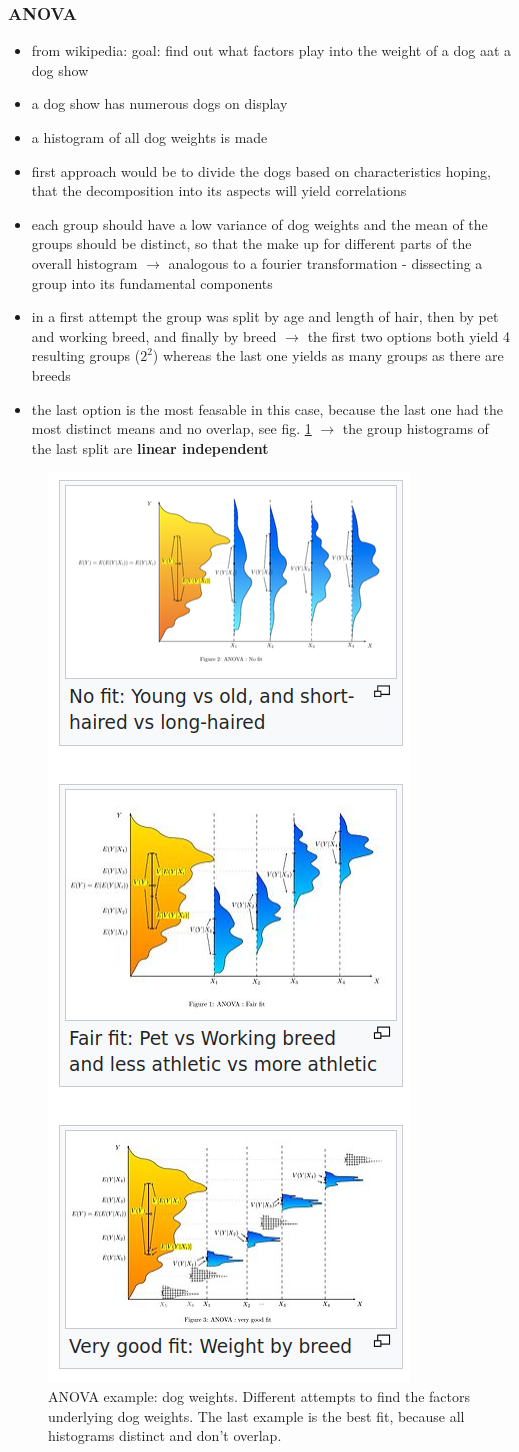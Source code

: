 \documentclass[12pt,a4paper]{article}
\begin{document}
\subsubsection{ANOVA} %
\label{ssub:anova}
\begin{itemize}
  \item from wikipedia: goal: find out what factors play into the weight of a dog aat a dog show
  \item a dog show has numerous dogs on display
  \item a histogram of all dog weights is made
  \item first approach would be to divide the dogs based on characteristics hoping, that the decomposition into its aspects will yield correlations
  \item each group should have a low variance of dog weights and the mean of the groups should be distinct, so that the make up for different parts of the overall histogram
  \newline \indent $\longrightarrow$ analogous to a fourier transformation - dissecting a group into its fundamental components
  \item in a first attempt the group was split by age and length of hair, then by pet and working breed, and finally by breed
  \newline \indent $\longrightarrow$ the first two options both yield 4 resulting groups ($2^2$) whereas the last one yields as many groups as there are breeds
  \item the last option is the most feasable in this case, because the last one had the most distinct means and no overlap, see fig. \ref{fig:anova}
  \newline \indent $\longrightarrow$ the group histograms of the last split are \textbf{linear independent}
\end{itemize}

\begin{figure}
  \centering
  \includegraphics[width=.3\linewidth]{Images/ANOVA.png}
  \caption[ANOVA example: dog weights]{ANOVA example: dog weights. Different attempts to find the factors underlying dog weights. The last example is the best fit, because all histograms distinct and don't overlap.}
  \label{fig:anova}
\end{figure}
\end{document}
